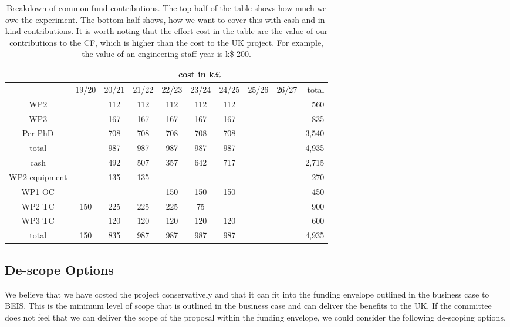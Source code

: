 \begin{table}
{
    \centering
    \begin{tabular}{|c||c|c|c|c|c|c|c|c||r|}
        \cline{2-10} \multicolumn{1}{c|}{\ } & \multicolumn{9}{c|}{cost in k£}\\
         \hline
           & 19/20 & 20/21 & 21/22 & 22/23 & 23/24 & 24/25 & 25/26 & 26/27 & total\\
         \hline\hline
         WP2     & & 112 & 112 & 112 & 112 & 112 & & & 560  \\ %
         WP3     & & 167 & 167 & 167 & 167 & 167 & & & 835  \\ %
         Per PhD & & 708 & 708 & 708 & 708 & 708 & & & 3,540 \\
         \hline
         total  &  & 987 & 987 & 987 & 987 & 987 & & & 4,935 \\
         \hline\hline
         cash          &     & 492 & 507 & 357 & 642 & 717 &     &     & 2,715 \\ %
         WP2 equipment &     & 135 & 135 &     &     &     &     &     & 270 \\ %
         WP1 OC        &     &     &     & 150 & 150 & 150 &     &     & 450 \\ %
         WP2 TC        & 150 & 225 & 225 & 225 &  75 &     &     &     & 900 \\ %
         WP3 TC        &     & 120 & 120 & 120 & 120 & 120 &     &     & 600 \\ %
         \hline         
         total         & 150 & 835 & 987 & 987 & 987 & 987 &     &     & 4,935 \\
         \hline
    \end{tabular}
    \caption{Breakdown of common fund contributions. The top half of the table shows how much we owe the experiment. The bottom half shows, how we want to cover this with cash and in-kind contributions. It is worth noting that the effort cost in the table are the value of our contributions to the CF, which is higher than the cost to the UK project. For example, the value of an engineering staff year is k\$ 200.}
    \label{tab:CF}
}
\end{table}

\subsection{De-scope Options}
We believe that we have costed the project conservatively and that it can fit into the funding envelope outlined in the business case to BEIS. This is the minimum level of scope that is outlined in the business case and can deliver the benefits to the UK. If the committee does not feel that we can deliver the scope of the proposal within the funding envelope, we could consider the following de-scoping options.

